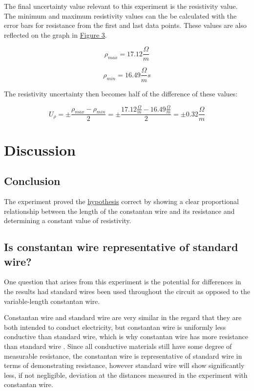 \documentclass{article}
\begin{document}
The final uncertainty value relevant to this experiment is the resistivity value. The minimum and maximum resistivity values can the be calculated with the error bars for resistance from the first and last data points. These values are also reflected on the graph in \hyperref[fig:graph]{Figure 3}.

\begin{equation}
    \rho_{max} = 17.12\frac{\Omega}{m}    
\end{equation}

\begin{equation}
    \rho_{min} = 16.49\frac{\Omega}{m}    s
\end{equation}

The resistivity uncertainty then becomes half of the difference of these values:

\begin{equation}
    U_{\rho} = \pm\frac{\rho_{max} - \rho_{min}}{2} = \pm\frac{17.12\frac{\Omega}{m} - 16.49\frac{\Omega}{m}}{2} = \pm 0.32\frac{\Omega}{m}
\end{equation}


\section{Discussion}

\subsection{Conclusion}

The experiment proved the \hyperref[sec:hypot]{hypothesis} correct by showing a clear proportional relationship between the length of the constantan wire and its resistance and determining a constant value of resistivity. 

\subsection{Is constantan wire representative of standard wire?}
\label{sec:wires}

One question that arises from this experiment is the potential for differences in the results had standard wires been used throughout the circuit as opposed to the variable-length constantan wire.

Constantan wire and standard wire are very similar in the regard that they are both intended to conduct electricity, but constantan wire is uniformly less conductive than standard wire, which is why constantan wire has more resistance than standard wire \cite{sis}. Since all conductive materials still have some degree of measurable resistance, the constantan wire is representative of standard wire in terms of demonstrating resistance, however standard wire will show significantly less, if not negligible, deviation at the distances measured in the experiment with constantan wire.
\end{document}
